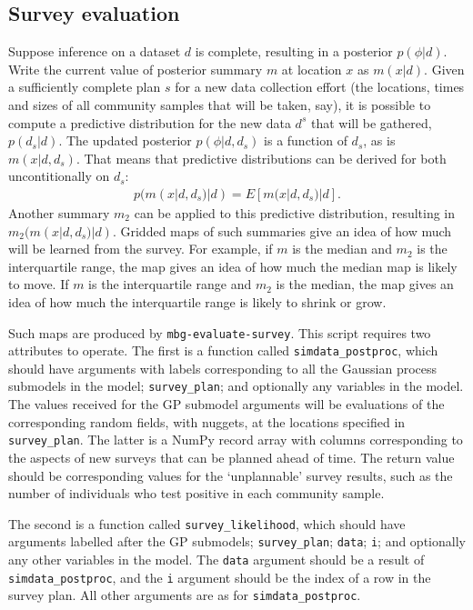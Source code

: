 \subsection{Survey evaluation}
\label{sub:survey-eval} 
Suppose inference on a dataset $d$ is complete, resulting in a posterior $p(\phi|d)$. Write the current value of posterior summary $m$ at location $x$ as $m(x|d)$. Given a sufficiently complete plan $s$ for a new data collection effort (the locations, times and sizes of all community samples that will be taken, say), it is possible to compute a predictive distribution for the new data $d^s$ that will be gathered, $p(d_s|d)$. The updated posterior $p(\phi|d,d_s)$ is a function of $d_s$, as is $m(x|d,d_s)$. That means that predictive distributions can be derived for both uncontitionally on $d_s$:
\begin{eqnarray*}
    p(m(x|d,d_s)|d) = E\left[m(x|d,d_s)|d\right].
\end{eqnarray*}
Another summary $m_2$ can be applied to this predictive distribution, resulting in $m_2(m(x|d,d_s)|d)$. Gridded maps of such summaries give an idea of how much will be learned from the survey. For example, if $m$ is the median and $m_2$ is the interquartile range, the map gives an idea of how much the median map is likely to move. If $m$ is the interquartile range and $m_2$ is the median, the map gives an idea of how much the interquartile range is likely to shrink or grow. 

Such maps are produced by \texttt{mbg-evaluate-survey}. This script requires two attributes to operate. The first is a function called \texttt{simdata\_postproc}, which should have arguments with labels corresponding to all the Gaussian process submodels in the model; \texttt{survey\_plan}; and optionally any variables in the model. The values received for the GP submodel arguments will be evaluations of the corresponding random fields, with nuggets, at the locations specified in \texttt{survey\_plan}. The latter is a NumPy record array with columns corresponding to the aspects of new surveys that can be planned ahead of time. The return value should be corresponding values for the `unplannable' survey results, such as the number of individuals who test positive in each community sample.

The second is a function called \texttt{survey\_likelihood}, which should have arguments labelled after the GP submodels; \texttt{survey\_plan}; \texttt{data}; \texttt{i}; and optionally any other variables in the model. The \texttt{data} argument should be a result of \texttt{simdata\_postproc}, and the \texttt{i} argument should be the index of a row in the survey plan. All other arguments are as for \texttt{simdata\_postproc}.

